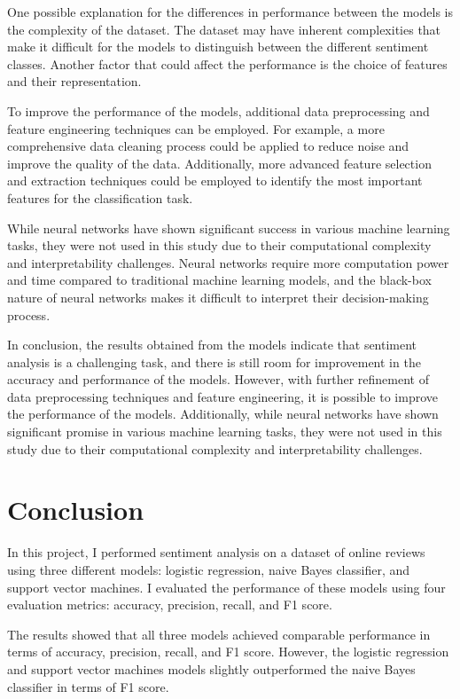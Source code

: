 \documentclass{article}
\begin{document}
One possible explanation for the differences in performance between the models is the complexity of the dataset. The dataset may have inherent complexities that make it difficult for the models to distinguish between the different sentiment classes. Another factor that could affect the performance is the choice of features and their representation.

To improve the performance of the models, additional data preprocessing and feature engineering techniques can be employed. For example, a more comprehensive data cleaning process could be applied to reduce noise and improve the quality of the data. Additionally, more advanced feature selection and extraction techniques could be employed to identify the most important features for the classification task.

While neural networks have shown significant success in various machine learning tasks, they were not used in this study due to their computational complexity and interpretability challenges. Neural networks require more computation power and time compared to traditional machine learning models, and the black-box nature of neural networks makes it difficult to interpret their decision-making process.

In conclusion, the results obtained from the models indicate that sentiment analysis is a challenging task, and there is still room for improvement in the accuracy and performance of the models. However, with further refinement of data preprocessing techniques and feature engineering, it is possible to improve the performance of the models. Additionally, while neural networks have shown significant promise in various machine learning tasks, they were not used in this study due to their computational complexity and interpretability challenges.


\section{Conclusion}

In this project, I performed sentiment analysis on a dataset of online reviews using three different models: logistic regression, naive Bayes classifier, and support vector machines. I evaluated the performance of these models using four evaluation metrics: accuracy, precision, recall, and F1 score.

The results showed that all three models achieved comparable performance in terms of accuracy, precision, recall, and F1 score. However, the logistic regression and support vector machines models slightly outperformed the naive Bayes classifier in terms of F1 score.
\end{document}
